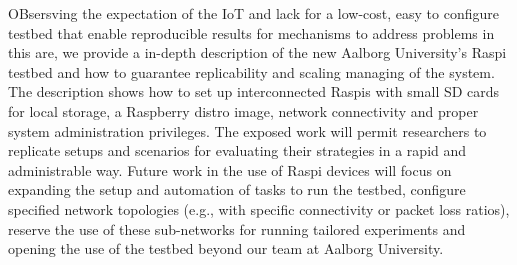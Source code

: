 \label{sec:conclusions}
OBsersving the expectation of the \ac{IoT} and lack for a low-cost, easy to configure testbed that enable reproducible results for mechanisms to address problems in this are, we provide a in-depth description of the new Aalborg University's \ac{Raspi} testbed and how to guarantee replicability and scaling managing of the system. The description shows how to set up interconnected \ac{Raspi}s with small SD cards for local storage, a Raspberry distro image, network connectivity and proper system administration privileges. The exposed work will permit researchers to replicate setups and scenarios for evaluating their strategies in a rapid and administrable way. Future work in the use of \ac{Raspi} devices will focus on expanding the setup and automation of tasks to run the testbed, configure specified network topologies (e.g., with specific connectivity or packet loss ratios), reserve the use of these sub-networks for running tailored experiments and opening the use of the testbed beyond our team at Aalborg University.
